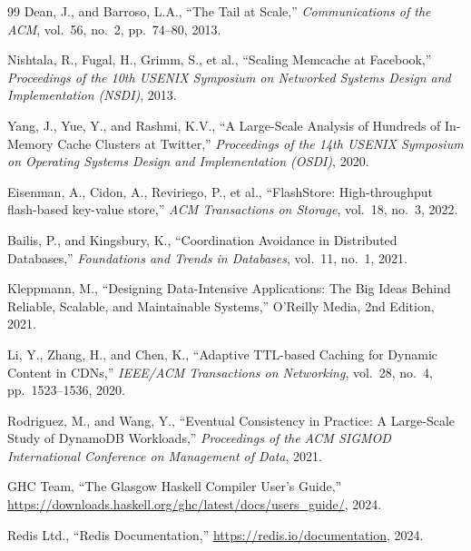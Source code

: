 \documentclass[12pt,a4paper]{report}
\begin{document}
\begin{thebibliography}{99}
    Dean, J., and Barroso, L.A.,
    ``The Tail at Scale,''
    \textit{Communications of the ACM}, vol.~56, no.~2, pp.~74--80, 2013.

    Nishtala, R., Fugal, H., Grimm, S., et al.,
    ``Scaling Memcache at Facebook,''
    \textit{Proceedings of the 10th USENIX Symposium on Networked Systems Design and Implementation (NSDI)}, 2013.

    Yang, J., Yue, Y., and Rashmi, K.V.,
    ``A Large-Scale Analysis of Hundreds of In-Memory Cache Clusters at Twitter,''
    \textit{Proceedings of the 14th USENIX Symposium on Operating Systems Design and Implementation (OSDI)}, 2020.

    Eisenman, A., Cidon, A., Reviriego, P., et al.,
    ``FlashStore: High-throughput flash-based key-value store,'' 
    \textit{ACM Transactions on Storage}, vol.~18, no.~3, 2022.

    Bailis, P., and Kingsbury, K.,
    ``Coordination Avoidance in Distributed Databases,''
    \textit{Foundations and Trends in Databases}, vol.~11, no.~1, 2021.

    Kleppmann, M.,
    ``Designing Data-Intensive Applications: The Big Ideas Behind Reliable, Scalable, and Maintainable Systems,''
    O'Reilly Media, 2nd Edition, 2021.

    Li, Y., Zhang, H., and Chen, K.,
    ``Adaptive TTL-based Caching for Dynamic Content in CDNs,''
    \textit{IEEE/ACM Transactions on Networking}, vol.~28, no.~4, pp.~1523--1536, 2020.

    Rodriguez, M., and Wang, Y.,
    ``Eventual Consistency in Practice: A Large-Scale Study of DynamoDB Workloads,''
    \textit{Proceedings of the ACM SIGMOD International Conference on Management of Data}, 2021.

    GHC Team,
    ``The Glasgow Haskell Compiler User's Guide,''
    \url{https://downloads.haskell.org/ghc/latest/docs/users_guide/}, 2024.

    Redis Ltd.,
    ``Redis Documentation,''
    \url{https://redis.io/documentation}, 2024.


\end{thebibliography}
\end{document}
